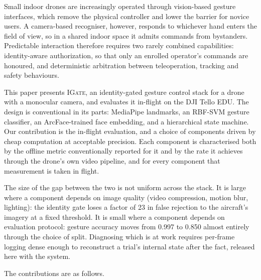 \documentclass[conference]{IEEEtran}
\newcommand{\method}[1]{\textsc{#1}}
\begin{document}
Small indoor drones are increasingly operated through vision-based gesture
interfaces, which remove the physical controller and lower the barrier for
novice users.
A camera-based recogniser, however, responds to whichever hand enters the field
of view, so in a shared indoor space it admits commands from bystanders.
Predictable interaction therefore requires two rarely combined capabilities:
identity-aware authorization, so that only an enrolled operator's commands are
honoured, and deterministic arbitration between teleoperation, tracking and
safety behaviours.

This paper presents \method{IGate}, an identity-gated gesture control stack for a drone with a monocular camera, and evaluates it in-flight on the DJI Tello EDU.
The design is conventional in its parts: MediaPipe landmarks, an RBF-SVM gesture
classifier, an ArcFace-trained face embedding, and a hierarchical state machine.
Our contribution is the in-flight evaluation, and a choice of components driven by cheap computation at acceptable precision.
Each component is characterised both by the offline metric conventionally
reported for it and by the rate it achieves through the drone's own video
pipeline, and for every component that measurement is taken in flight.

The size of the gap between the two is not uniform across the stack.
It is large where a component depends on image quality (video compression, motion blur, lighting): the identity gate loses
a factor of 23 in false rejection to the aircraft's imagery at a fixed
threshold.
It is small where a component depends on evaluation protocol: gesture accuracy
moves from 0.997 to 0.850 almost entirely through the choice of split.
Diagnosing which is at work requires per-frame logging dense enough to
reconstruct a trial's internal state after the fact, released here with the
system.

The contributions are as follows.
\end{document}
